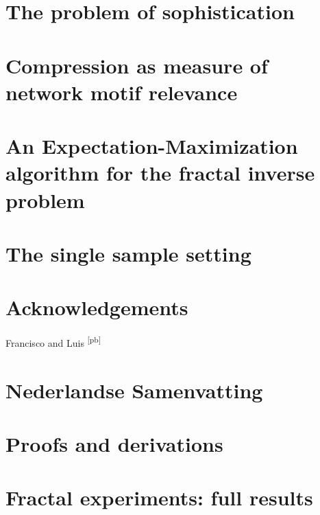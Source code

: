 \documentclass{thesis}
\theoremstyle{definition}
\newcommand{\pb}[1]{\textcolor{OliveGreen}{\small #1 \textsuperscript{[pb]} }}
\begin{document}
\chapter{The problem of sophistication}


\label{chapter:problem}
\chapter{Compression as measure of network motif relevance}


\label{chapter:motifs}
\chapter{An Expectation-Maximization algorithm for the fractal inverse problem}


\label{chapter:fractals}
\chapter{The single sample setting}


\label{chapter:conlusion}



\chapter*{Acknowledgements}

\pb{Francisco and Luis}

\chapter*{Nederlandse Samenvatting}

\appendix 

\chapter{Proofs and derivations}

 

\chapter{Fractal experiments: full results}

%  

\printindex
\end{document}
